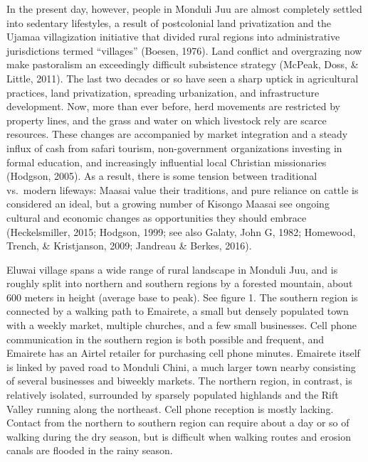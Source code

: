 \documentclass[
  11pt,
]{article}
\begin{document}
In the present day, however, people in Monduli Juu are almost completely
settled into sedentary lifestyles, a result of postcolonial land
privatization and the Ujamaa villagization initiative that divided rural
regions into administrative jurisdictions termed ``villages'' (Boesen,
1976). Land conflict and overgrazing now make pastoralism an exceedingly
difficult subsistence strategy (McPeak, Doss, \& Little, 2011). The last
two decades or so have seen a sharp uptick in agricultural practices,
land privatization, spreading urbanization, and infrastructure
development. Now, more than ever before, herd movements are restricted
by property lines, and the grass and water on which livestock rely are
scarce resources. These changes are accompanied by market integration
and a steady influx of cash from safari tourism, non-government
organizations investing in formal education, and increasingly
influential local Christian missionaries (Hodgson, 2005). As a result,
there is some tension between traditional vs.~modern lifeways: Maasai
value their traditions, and pure reliance on cattle is considered an
ideal, but a growing number of Kisongo Maasai see ongoing cultural and
economic changes as opportunities they should embrace (Heckelsmiller,
2015; Hodgson, 1999; see also Galaty, John G, 1982; Homewood, Trench, \&
Kristjanson, 2009; Jandreau \& Berkes, 2016).

Eluwai village spans a wide range of rural landscape in Monduli Juu, and
is roughly split into northern and southern regions by a forested
mountain, about 600 meters in height (average base to peak). See figure
1. The southern region is connected by a walking path to Emairete, a
small but densely populated town with a weekly market, multiple
churches, and a few small businesses. Cell phone communication in the
southern region is both possible and frequent, and Emairete has an
Airtel retailer for purchasing cell phone minutes. Emairete itself is
linked by paved road to Monduli Chini, a much larger town nearby
consisting of several businesses and biweekly markets. The northern
region, in contrast, is relatively isolated, surrounded by sparsely
populated highlands and the Rift Valley running along the northeast.
Cell phone reception is mostly lacking. Contact from the northern to
southern region can require about a day or so of walking during the dry
season, but is difficult when walking routes and erosion canals are
flooded in the rainy season.
\end{document}

